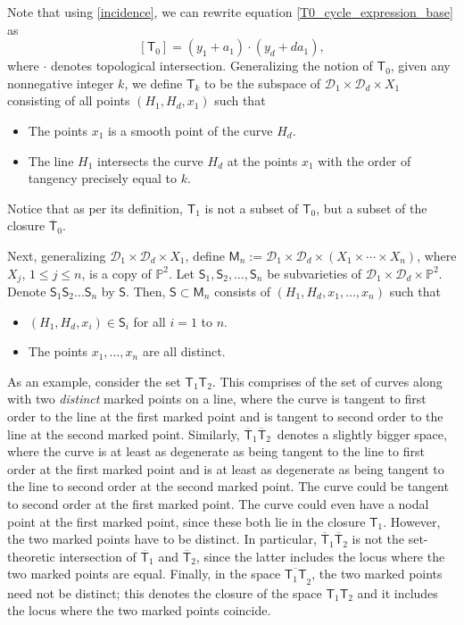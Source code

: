 \documentclass[11pt]{article}
\numberwithin{equation}{section}
\begin{document}
Note that using \eqref{incidence}, we can rewrite equation \eqref{T0_cycle_expression_base} as
\begin{equation}\label{T0_cycle_expression_base_ag}
[\mathsf{T}_0]  =  (y_1 + a_1)\cdot(y_d + d a_1),
\end{equation}
where $\cdot$ denotes topological intersection. Generalizing the notion of
$\mathsf{T}_0$, given any nonnegative integer $k$, we define $\mathsf{T}_k$
to be the subspace of $\mathcal{D}_1 \times \mathcal{D}_d\times X_1$
consisting of all points $(H_1, H_d, x_1)$ such that
\begin{itemize}\itemsep=0pt
\item The points $x_1$ is a smooth point of the curve $H_d$.
\item The line $H_1$
intersects the curve $H_d$ at the points $x_1$
with the order of tangency precisely equal to $k$.
\end{itemize}
Notice that as per its definition, $\mathsf{T}_1$ is not a subset of $\mathsf{T}_0$, but a subset of the
closure $\overline{\mathsf{T}}_0$.

Next, generalizing $\mathcal{D}_1 \times \mathcal{D}_d \times X_1$, define
$
\mathsf{M}_n :=  \mathcal{D}_1 \times \mathcal{D}_d \times (X_1\times \cdots\times X_n)$,
where $X_j$, $1 \leq j \leq n$, is a copy of $\mathbb{P}^2$.
Let $\mathsf{S}_1, \mathsf{S}_2, \dots, \mathsf{S}_n$ be subvarieties of
$\mathcal{D}_1 \times \mathcal{D}_d \times \mathbb{P}^2$.
Denote $\mathsf{S}_1 \mathsf{S}_2 \dots \mathsf{S}_n$ by $\mathsf{S}$. Then,
$\mathsf{S} \subset \mathsf{M}_n$
consists of
$(H_1, H_d, x_1,\dots, x_n)$ such that
\begin{itemize}\itemsep=0pt
\item $(H_1, H_d, x_i) \in \mathsf{S}_i$ for all $i=1$ to $n$.
\item The points $x_1,\dots, x_n$ are all distinct.
\end{itemize}
As an example, consider the set $\mathsf{T}_1 \mathsf{T}_2$. This comprises of the set of
curves along with two \textit{distinct} marked points on a line, where the curve is tangent to first order to
the line at the first marked point and is tangent to second order to the line at the
second marked point.
Similarly, $\overline{\mathsf{T}}_1 \overline{\mathsf{T}}_2$~denotes a slightly bigger space, where the curve is
at least as degenerate as being tangent to the line to first order at the first marked
point and is at least
as degenerate as being tangent to the line to second order at the second marked point.
The curve could be tangent to second order at the first marked point. The curve could even have a nodal
point at the first marked point, since these both lie in the closure $\mathsf{T}_1$.
However, the two marked points have to be distinct.
In particular, $\overline{\mathsf{T}}_1 \overline{\mathsf{T}}_2$
is not the set-theoretic intersection of
$\overline{\mathsf{T}}_1$ and $\overline{\mathsf{T}}_2$, since the latter
includes the locus where the two marked points are equal.
Finally, in the space
$\overline{\mathsf{T}_1 \mathsf{T}}_2$, the two marked points need not be distinct; this denotes the
closure of the space $\mathsf{T}_1 \mathsf{T}_2$ and it includes the locus where the two marked points coincide.
\end{document}
